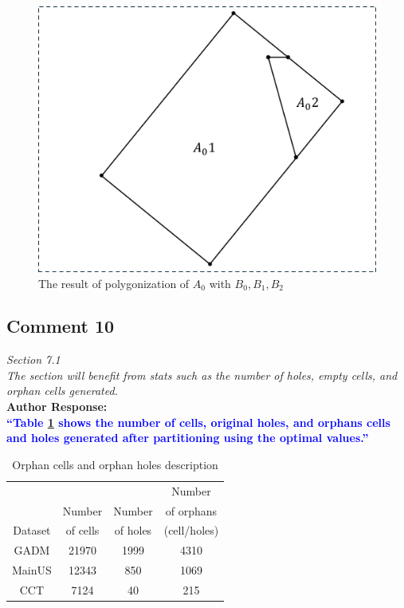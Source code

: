 \documentclass[10pt]{article}
\newcounter{tablemajor}
\newcommand*\settablecounter[1]{%
        \setcounter{tablemajor}{#1}%
}
\newcounter{figuremajor}
\newcommand*\setfigurecounter[1]{%
        \setcounter{figuremajor}{#1}%
}
\begin{document}
\setfigurecounter{16}
\begin{figure}[h!]
	\centering
	\includegraphics[width=0.55\linewidth ]{figures/DangleOverlay3.pdf}
	\caption[caption]{The result of polygonization of $A_0$ with $B_0, B_1, B_2$}
	\label{fig:dangleoverlay:result}
\end{figure}

\subsection*{Comment 10}
\textit{
Section 7.1\\
The section will benefit from stats such as the number of holes, empty cells, and orphan cells generated.
} \\

\textbf{Author Response:}\\
\textbf{\textcolor{blue}{
``Table \ref{tab:orphans} shows the number of cells, original holes, and orphans cells and holes generated after partitioning using the optimal values.''
}}

\settablecounter{6}
\begin{table}[h!]
    \centering
    \caption{Orphan cells and orphan holes description}
    \label{tab:orphans}
    \begin{tabular}{c c c c}
        \hline
                &          &          & Number       \\
                & Number   & Number   & of orphans   \\
        Dataset & of cells & of holes & (cell/holes) \\
        \hline
        GADM  & 21970      & 1999     & 4310 \\
        MainUS& 12343      & 850      & 1069 \\
        CCT   & 7124       & 40       & 215  \\
        \hline
    \end{tabular}
\end{table}
\end{document}
